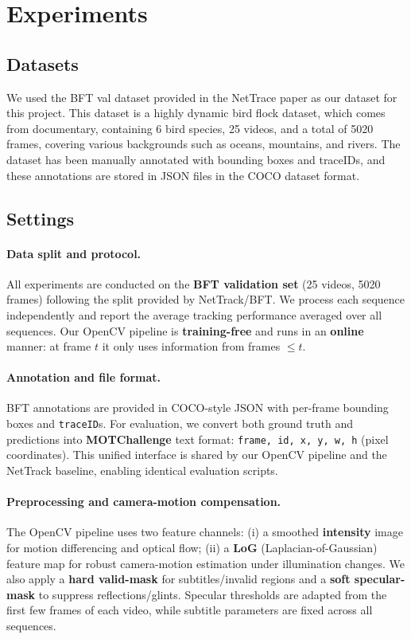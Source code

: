 \section{Experiments}
\subsection{Datasets}

We used the BFT val dataset provided in the NetTrace paper as our dataset for this project. This dataset is a highly dynamic bird flock dataset, which comes from documentary,  containing 6 bird species, 25 videos, and a total of 5020 frames, covering various backgrounds such as oceans, mountains, and rivers. The dataset has been manually annotated with bounding boxes and traceIDs, and these annotations are stored in JSON files in the COCO dataset format.

\subsection{Settings}
\label{sec:exp_settings}

\paragraph{Data split and protocol.}
All experiments are conducted on the \textbf{BFT validation set} (25 videos, 5020 frames) following the split provided by NetTrack/BFT.
We process each sequence independently and report the average tracking performance averaged over all sequences.
Our OpenCV pipeline is \textbf{training-free} and runs in an \textbf{online} manner: at frame $t$ it only uses information from frames $\le t$.

\paragraph{Annotation and file format.}
BFT annotations are provided in COCO-style JSON with per-frame bounding boxes and \texttt{traceID}s.
For evaluation, we convert both ground truth and predictions into \textbf{MOTChallenge} text format:
\texttt{frame, id, x, y, w, h} (pixel coordinates).
This unified interface is shared by our OpenCV pipeline and the NetTrack baseline, enabling identical evaluation scripts.

\paragraph{Preprocessing and camera-motion compensation.}
The OpenCV pipeline uses two feature channels:
(i) a smoothed \textbf{intensity} image for motion differencing and optical flow;
(ii) a \textbf{LoG} (Laplacian-of-Gaussian) feature map for robust camera-motion estimation under illumination changes.
We also apply a \textbf{hard valid-mask} for subtitles/invalid regions and a \textbf{soft specular-mask} to suppress reflections/glints.
Specular thresholds are adapted from the first few frames of each video, while subtitle parameters are fixed across all sequences.


